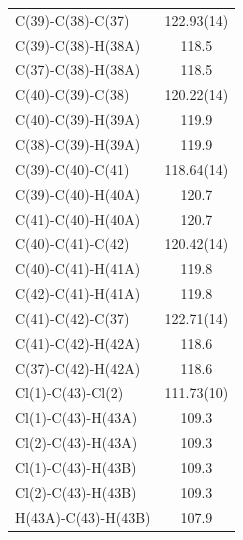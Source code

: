 \begin{center}
{\begin{supertabular}{p{1.5in}c}
C(39)-C(38)-C(37)&122.93(14)\\
C(39)-C(38)-H(38A)&118.5\\
C(37)-C(38)-H(38A)&118.5\\
C(40)-C(39)-C(38)&120.22(14)\\
C(40)-C(39)-H(39A)&119.9\\
C(38)-C(39)-H(39A)&119.9\\
C(39)-C(40)-C(41)&118.64(14)\\
C(39)-C(40)-H(40A)&120.7\\
C(41)-C(40)-H(40A)&120.7\\
C(40)-C(41)-C(42)&120.42(14)\\
C(40)-C(41)-H(41A)&119.8\\
C(42)-C(41)-H(41A)&119.8\\
C(41)-C(42)-C(37)&122.71(14)\\
C(41)-C(42)-H(42A)&118.6\\
C(37)-C(42)-H(42A)&118.6\\
Cl(1)-C(43)-Cl(2)&111.73(10)\\
Cl(1)-C(43)-H(43A)&109.3\\
Cl(2)-C(43)-H(43A)&109.3\\
Cl(1)-C(43)-H(43B)&109.3\\
Cl(2)-C(43)-H(43B)&109.3\\
H(43A)-C(43)-H(43B)&107.9\\
\end{supertabular}
}
\end{center}

